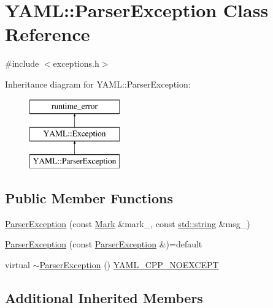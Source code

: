 \hypertarget{class_y_a_m_l_1_1_parser_exception}{}\section{Y\+A\+ML\+::Parser\+Exception Class Reference}
\label{class_y_a_m_l_1_1_parser_exception}


{\ttfamily \#include $<$exceptions.\+h$>$}

Inheritance diagram for Y\+A\+ML\+::Parser\+Exception\+:\begin{figure}[H]
\begin{center}
\leavevmode
\includegraphics[height=3.000000cm]{class_y_a_m_l_1_1_parser_exception}
\end{center}
\end{figure}
\subsection*{Public Member Functions}
\begin{DoxyCompactItemize}
\item 
\mbox{\hyperlink{class_y_a_m_l_1_1_parser_exception_a5a1d0825f91f252f08876be881b0847a}{Parser\+Exception}} (const \mbox{\hyperlink{struct_y_a_m_l_1_1_mark}{Mark}} \&mark\+\_\+, const \mbox{\hyperlink{glad_8h_ac83513893df92266f79a515488701770}{std\+::string}} \&msg\+\_\+)
\item 
\mbox{\hyperlink{class_y_a_m_l_1_1_parser_exception_aff21f430941908d29dcf8c4348482574}{Parser\+Exception}} (const \mbox{\hyperlink{class_y_a_m_l_1_1_parser_exception}{Parser\+Exception}} \&)=default
\item 
virtual \mbox{\hyperlink{class_y_a_m_l_1_1_parser_exception_a67e0c3483cb340fe09d6b0779ab6613d}{$\sim$\+Parser\+Exception}} () \mbox{\hyperlink{exceptions_8cpp_a4ea58eb0a28000364858d4942add7d1a}{Y\+A\+M\+L\+\_\+\+C\+P\+P\+\_\+\+N\+O\+E\+X\+C\+E\+PT}}
\end{DoxyCompactItemize}
\subsection*{Additional Inherited Members}



